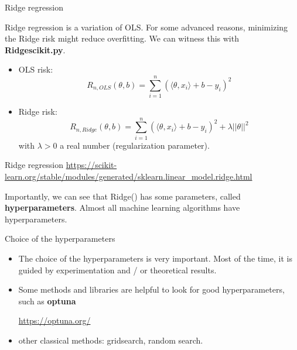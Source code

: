 \documentclass[usenames,dvipsnames,french]{beamer}
\begin{document}
\begin{frame}{Ridge regression}

    Ridge regression is a variation of OLS. For some advanced reasons, minimizing the Ridge risk might reduce overfitting. We can witness this with \textbf{Ridge\textunderscore scikit.py}.

    \begin{itemize}
    	\item OLS  risk:
    \begin{equation}
	R_{n, OLS}(\theta, b) = \sum_{i=1}^{n} (\langle \theta,  x_i \rangle +b-y_i)^2
    \end{equation}
    \item Ridge risk:
    \begin{equation}
	R_{n, Ridge}(\theta, b) = \sum_{i=1}^{n} (\langle\theta, x_i\rangle+b-y_i)^2 + \lambda ||\theta||^2
    \end{equation}
	    with $\lambda >0 $ a real number (regularization parameter).
    \end{itemize}

\end{frame}

\begin{frame}{Ridge regression}
    \url{https://scikit-learn.org/stable/modules/generated/sklearn.linear_model.ridge.html} 

    Importantly, we can see that Ridge() has some parameters, called
    \textbf{hyperparameters}. Almost all machine learning algorithms have
    hyperparameters.

\end{frame}

\begin{frame}{Choice of the hyperparameters}

    \begin{itemize}
        \item The choice of the hyperparameters is very important. Most of the time, it
    is guided by experimentation and / or theoretical results.
    \item Some methods and libraries are helpful to look for good
        hyperparameters, such as \textbf{optuna}

        \url{https://optuna.org/} 

        \item other classical methods: gridsearch, random search.
    \end{itemize}

\end{frame}
\end{document}
